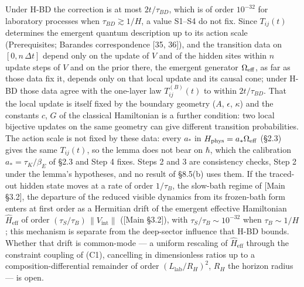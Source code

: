 \documentclass[
]{article}
\begin{document}
Under H-BD the correction is at most \(2t/\tau_{BD}\), which is of order
\(10^{-32}\) for laboratory processes when \(\tau_{BD} \gtrsim 1/H\), a
value S1--S4 do not fix. Since \(T_{ij}(t)\) determines the emergent
quantum description up to its action scale (Prerequisites; Barandes
correspondence {[}35, 36{]}), and the transition data on
\([0, n\,\Delta t]\) depend only on the update of \(V\) and of the
hidden sites within \(n\) update steps of \(V\) and on the prior there,
the emergent generator \(\Omega_{\rm eff}\), as far as those data fix
it, depends only on that local update and its causal cone; under H-BD
those data agree with the one-layer law \(T^{(B)}_{ij}(t)\) to within
\(2t/\tau_{BD}\). That the local update is itself fixed by the boundary
geometry (\(A\), \(\epsilon\), \(\kappa\)) and the constants \(c\),
\(G\) of the classical Hamiltonian is a further condition: two local
bijective updates on the same geometry can give different transition
probabilities. The action scale is not fixed by these data: every
\(a_*\) in \(H_{\rm phys}=a_*\Omega_{\rm eff}\) (§2.3) gives the same
\(T_{ij}(t)\), so the lemma does not bear on \(\hbar\), which the
calibration \(a_*=\tau_K/\beta_E\) of §2.3 and Step 4 fixes. Steps 2 and
3 are consistency checks, Step 2 under the lemma's hypotheses, and no
result of §8.5(b) uses them. If the traced-out hidden state moves at a
rate of order \(1/\tau_B\), the slow-bath regime of {[}Main §3.2{]}, the
departure of the reduced visible dynamics from its frozen-bath form
enters at first order as a Hermitian drift of the emergent effective
Hamiltonian \(\hat{H}_{\text{eff}}\) of order
\((\tau_S/\tau_B)\,\|V_{\text{int}}\|\) ({[}Main §3.2{]}), with
\(\tau_S/\tau_B \sim 10^{-32}\) when \(\tau_B \sim 1/H\); this mechanism
is separate from the deep-sector influence that H-BD bounds. Whether
that drift is common-mode --- a uniform rescaling of
\(\hat{H}_{\text{eff}}\) through the constraint coupling of (C1),
cancelling in dimensionless ratios up to a composition-differential
remainder of order \((L_{\text{lab}}/R_H)^2\), \(R_H\) the horizon
radius --- is open.
\end{document}

